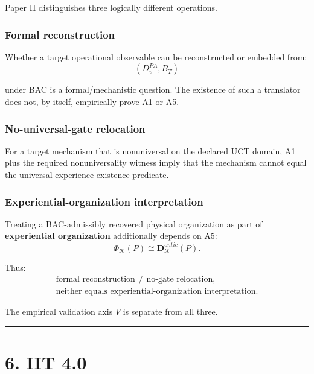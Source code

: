 \documentclass[
  11pt,
  a4paper,
]{article}
\begin{document}
Paper II distinguishes three logically different operations.

\hypertarget{formal-reconstruction}{%
\subsubsection{Formal reconstruction}\label{formal-reconstruction}}

Whether a target operational observable can be reconstructed or embedded
from:
\nopagebreak[4]
\[
(D^{PA}_v,B_T)
\]

under BAC is a formal/mechanistic question. The existence of such a
translator does not, by itself, empirically prove A1 or A5.

\hypertarget{no-universal-gate-relocation}{%
\subsubsection{No-universal-gate
relocation}\label{no-universal-gate-relocation}}

For a target mechanism that is nonuniversal on the declared UCT domain,
A1 plus the required nonuniversality witness imply that the mechanism
cannot equal the universal experience-existence predicate.

\hypertarget{experiential-organization-interpretation}{%
\subsubsection{Experiential-organization
interpretation}\label{experiential-organization-interpretation}}

Treating a BAC-admissibly recovered physical organization as part of
\textbf{experiential organization} additionally depends on A5:
\nopagebreak[4]
\[
\Phi_{\mathcal K}(P)\cong\mathbf D^{ontic}_{\mathcal K}(P).
\]

Thus:
\nopagebreak[4]
\[
\begin{gathered}
\text{formal reconstruction}\neq\text{no-gate relocation},\\
\text{neither equals experiential-organization interpretation}.
\end{gathered}
\]

The empirical validation axis \(V\) is separate from all three.

\begin{center}\rule{0.5\linewidth}{0.5pt}\end{center}

\hypertarget{iit-4.0}{%
\section{6. IIT 4.0}\label{iit-4.0}}
\end{document}
